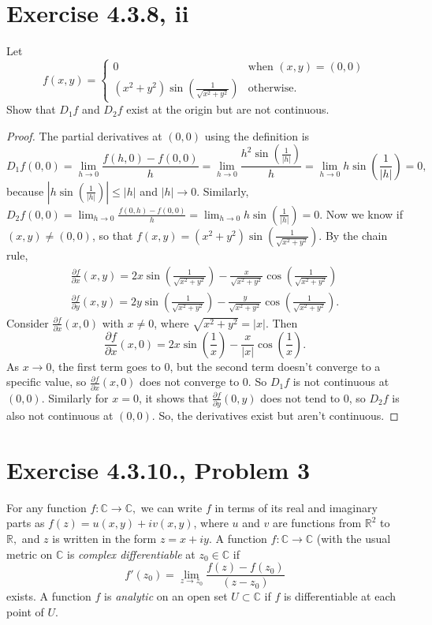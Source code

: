 \documentclass{article}
\begin{document}
\section*{Exercise 4.3.8, ii}
Let \\ 
$$
f(x, y) =
\begin{cases}
    0 & \text{when } (x,y) =(0,0) \\
    (x^2+y^2) \sin{(\frac{1}{\sqrt{x^2+y^2}})} & \text{otherwise.}
\end{cases}
$$
Show that $D_1f$ and $D_2f$ exist at the origin but are not continuous. 
\begin{proof}
The partial derivatives at $(0,0)$ using the definition is $$
D_1f(0,0)=\lim_{h\to0}\frac{f(h,0)-f(0,0)}{h}
=\lim_{h\to0}\frac{h^2\sin(\frac{1}{|h|})}{h}
=\lim_{h\to0}h\sin(\frac{1}{|h|})=0,$$
because $|h\sin(\frac{1}{|h|})|\le |h|$ and $|h|\to0$. Similarly,
$D_2f(0,0)=\lim_{h\to0}\frac{f(0,h)-f(0,0)}{h}
=\lim_{h\to0}h\sin(\frac{1}{|h|})=0.$ Now  we know if $(x,y)\neq(0,0)$, so that $f(x,y)=(x^2+y^2)\sin(\frac{1}{\sqrt{x^2+y^2}})$. By the chain rule, 
\begin{multline}
    \frac{\partial f}{\partial x}(x,y)=2x\sin(\frac{1}{\sqrt{x^2+y^2}})-\frac{x}{\sqrt{x^2+y^2}}\cos(\frac{1}{\sqrt{x^2+y^2}}) \\
    \frac{\partial f}{\partial y}(x,y)=2y\sin(\frac{1}{\sqrt{x^2+y^2}})-\frac{y}{\sqrt{x^2+y^2}}\cos(\frac{1}{\sqrt{x^2+y^2}}).
\end{multline}
Consider $\frac{\partial f}{\partial x}(x,0)$ with $x\ne0$, where $\sqrt{x^2+y^2}=|x|$. Then
$$
\frac{\partial f}{\partial x}(x,0)=2x\sin(\frac{1}{x})-\frac{x}{|x|}\cos(\frac{1}{x}).
$$
As $x\to0$, the first term goes to $0$, but the second term doesn't converge to a specific value, so $\frac{\partial f}{\partial x}(x,0)$ does not converge to 0. So $D_1f$ is not continuous at $(0,0)$. Similarly for $x=0$, it shows that $\frac{\partial f}{\partial y}(0,y)$ does not tend to 0, so $D_2f$ is also not continuous at $(0,0)$. So, the derivatives exist but aren't continuous. 
\end{proof}

\clearpage

\section*{Exercise 4.3.10., Problem 3}
For any function $f: \mathbb{C} \rightarrow \mathbb{C},$ we can write $f$ in terms of its real and imaginary parts as $f(z)=u(x,y)+iv(x,y)$, where $u$ and $v$ are functions from $\mathbb{R}^2$ to $\mathbb{R},$ and $z$ is written in the form $z = x+iy.$ A function $f: \mathbb{C} \rightarrow \mathbb{C}$ (with the usual metric on $\mathbb{C}$ is \textit{complex differentiable} at $z_0 \in \mathbb{C}$ if \\
$$ f'(z_0)=\lim_{z \rightarrow z_0}\frac{f(z)-f(z_0)}{(z-z_0)}$$
exists. A function $f$ is \textit{analytic} on an open set $U 
\subset \mathbb{C}$ if $f$ is differentiable at each point of $U$. 
\end{document}
